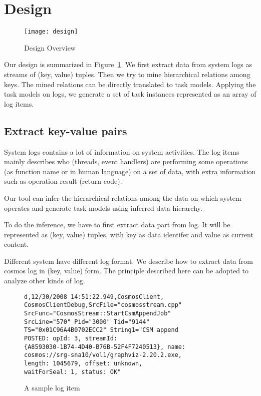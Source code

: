 
\section{Design}
\label{sec:design}

\begin{figure}
\centering
\texttt{[image: design]}
\caption{Design Overview}
\label{fig:design}
\end{figure}

Our design is summarized in Figure~\ref{fig:design}. We
first extract data from system logs as streams of (key,
value) tuples. Then we try to mine hierarchical relations
among keys. The mined relations can be directly translated
to task models. Applying the task models on logs, we
generate a set of task instances represented as an array of
log items.


\subsection{Extract key-value pairs}

System logs contains a lot of information on system
activities. The log items mainly describes who (threads,
event handlers) are performing some operations (as function
name or in human language) on a set of data, with extra
information such as operation result (return code).

Our tool can infer the hierarchical relations among the data
on which system operates and generate task models using
inferred data hierarchy.

To do the inference, we have to first extract data part
from log. It will be represented as (key, value) tuples,
with key as data identifer and value as current content.

Different system have different log format. We describe how
to extract data from cosmos log in (key, value) form. The
principle described here can be adopted to analyze other
kinds of log.

\begin{figure}
\begin{verbatim}
d,12/30/2008 14:51:22.949,CosmosClient,
CosmosClientDebug,SrcFile="cosmosstream.cpp"
SrcFunc="CosmosStream::StartCsmAppendJob"
SrcLine="570" Pid="3000" Tid="9144"
TS="0x01C96A4B0702ECC2" String1="CSM append
POSTED: opId: 3, streamId:
{A8593030-1B74-4D40-B76B-52F4F7240513}, name:
cosmos://srg-sna10/vol1/graphviz-2.20.2.exe,
length: 1045679, offset: unknown,
waitForSeal: 1, status: OK"
\end{verbatim}
\caption{A sample log item}
\label{fig:logitem}
\end{figure}

